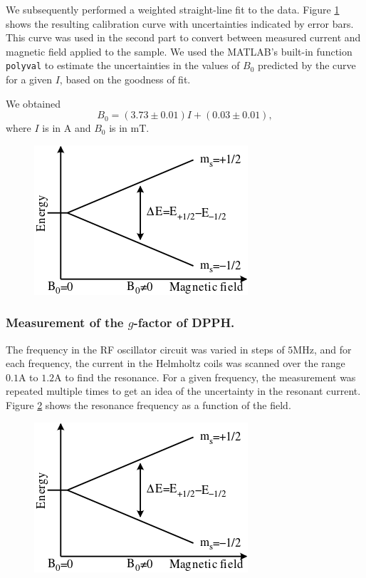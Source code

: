\documentclass[a4paper]{jpconf}
\numberwithin{equation}{section}
\begin{document}
We subsequently performed a weighted straight-line fit to the data. Figure \ref{fig: HC calibration curve} shows the resulting calibration curve with uncertainties indicated by error bars. This curve was used in the second part to convert between measured current and magnetic field applied to the sample. We used the MATLAB's built-in function \texttt{polyval} to estimate the uncertainties in the values of $B_0$ predicted by the curve for a given $I$, based on the goodness of fit.

We obtained 
\[
	B_0 = (3.73 \pm 0.01) I + (0.03 \pm 0.01),
\]
where $I$ is in $\si{\ampere}$ and $B_0$ is in $\si{\milli\tesla}$.

\begin{figure}[htbp]
	\includegraphics{EPR_splitting.png}
	\label{fig: HC calibration curve}
\end{figure}



\subsubsection{Measurement of the $g$-factor of DPPH.}
The frequency in the RF oscillator circuit was varied in steps of $5 \si{\mega\hertz}$, and for each frequency, the current in the Helmholtz coils was scanned over the range $0.1 \si{\ampere}$ to $1.2 \si{\ampere}$ to find the resonance. For a given frequency, the measurement was repeated multiple times to get an idea of the uncertainty in the resonant current. Figure \ref{fig: DPPH resonance} shows the resonance frequency as a function of the field.

\begin{figure}[htbp]
	\includegraphics{EPR_splitting.png}
	\label{fig: DPPH resonance}
\end{figure}
\end{document}
